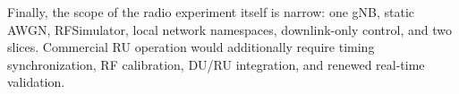 Finally, the scope of the radio experiment itself is narrow: one gNB, static AWGN, RFSimulator, local network namespaces, downlink-only control, and two slices. Commercial RU operation would additionally require timing synchronization, RF calibration, DU/RU integration, and renewed real-time validation.
